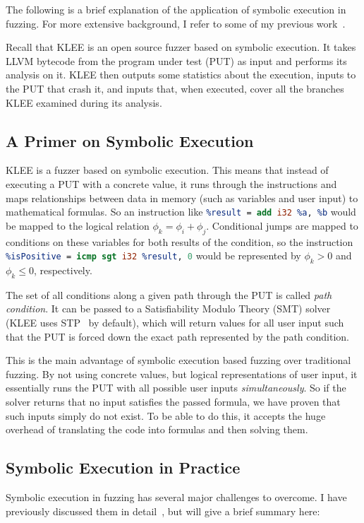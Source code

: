 \documentclass{article}
\let\savedCite=\cite
\renewcommand{\cite}{\unskip~\savedCite}
\begin{document}
The following is a brief explanation of the application of symbolic execution in fuzzing. For more extensive background, I refer to some of my previous work\cite{EVA, BA}.

Recall that KLEE is an open source fuzzer based on symbolic execution. It takes LLVM bytecode from the program under test (PUT) as input and performs its analysis on it. KLEE then outputs some statistics about the execution, inputs to the PUT that crash it, and inputs that, when executed, cover all the branches KLEE examined during its analysis.

\subsection{A Primer on Symbolic Execution}
KLEE is a fuzzer based on symbolic execution. This means that instead of executing a PUT with a concrete value, it runs through the instructions and maps relationships between data in memory (such as variables and user input) to mathematical formulas. So an instruction like \lstinline[language=llvm]{%result = add i32 %a, %b} would be mapped to the logical relation $\phi_k=\phi_i+\phi_j$. Conditional jumps are mapped to conditions on these variables for both results of the condition, so the instruction \lstinline[language=llvm]{%isPositive = icmp sgt i32 %result, 0} would be represented by $\phi_k>0$ and $\phi_k\le0$, respectively.

The set of all conditions along a given path through the PUT is called \textit{path condition}. It can be passed to a Satisfiability Modulo Theory (SMT) solver (KLEE uses STP\cite{STP} by default), which will return values for all user input such that the PUT is forced down the exact path represented by the path condition.

This is the main advantage of symbolic execution based fuzzing over traditional fuzzing. By not using concrete values, but logical representations of user input, it essentially runs the PUT with all possible user inputs \textit{simultaneously}. So if the solver returns that no input satisfies the passed formula, we have proven that such inputs simply do not exist. To be able to do this, it accepts the huge overhead of translating the code into formulas and then solving them.

\subsection{Symbolic Execution in Practice}
\label{SymbexPractice}
Symbolic execution in fuzzing has several major challenges to overcome. I have previously discussed them in detail\cite{EVA}, but will give a brief summary here:
\end{document}

